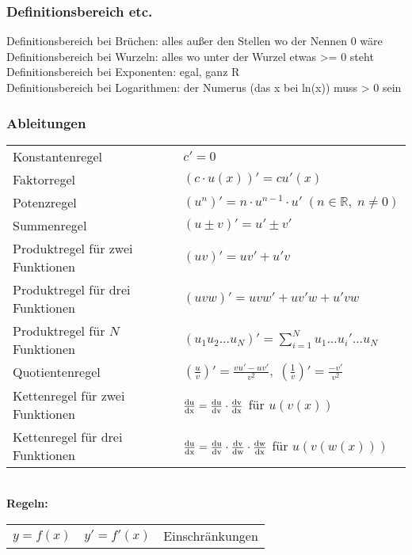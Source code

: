 \documentclass[6pt,a4paper]{scrartcl}
\begin{document}
\begin{multicols*}{2}
\subsubsection{Definitionsbereich etc.}
Definitionsbereich bei Brüchen: alles außer den Stellen wo der Nennen 0 wäre \\
Definitionsbereich bei Wurzeln: alles wo unter der Wurzel etwas >= 0 steht \\
Definitionsbereich bei Exponenten: egal, ganz R \\
Definitionsbereich bei Logarithmen: der Numerus (das x bei ln(x)) muss > 0 sein \\

\subsubsection{Ableitungen}
\begin{tabular}{ll}
Konstantenregel						& $ c'=0 $																								\\
Faktorregel							& $ (c \cdot u(x))' = c u'(x) $																			\\
Potenzregel							& $ \left(u^n\right)' = n \cdot u^{n-1} \cdot u'\; (n \in \mathbb R, \; n \neq 0) $						\\
Summenregel							& $ (u\pm v)' = u'\pm v' $																				\\
Produktregel für zwei Funktionen		& $ (uv)' = uv'+u'v $																					\\
Produktregel für drei Funktionen		& $ (uvw)' = uvw' + uv'w + u'vw $																		\\
Produktregel für $ N $ Funktionen	& $ (u_1u_2...u_N)' = \sum_{i=1}^Nu_1...u_i'...u_N $														\\
Quotientenregel						& $ \left(\frac{u}{v}\right)' = \frac{vu'-uv'}{v^2}, \; \left( \frac{1}{v}\right)' = \frac{-v'}{v^2} $		\\
Kettenregel für zwei Funktionen		& $ \frac{\rm d u}{\rm d x} = \frac{\rm d u}{\rm d v}\cdot \frac{\rm d v}{\rm d x} $ für $ u(v(x)) $		\\
Kettenregel für drei Funktionen		& $ \frac{\rm d u }{\rm d x} = \frac{\rm d u}{\rm d v}\cdot \frac{\rm d v}{\rm d w}\cdot \frac{\rm d w}{\rm d x} $ für $ u(v(w(x))) $ \\
\end{tabular}\\
\textbf{Regeln:}\\
\begin{tabular}{l|l|l}
$ y=f(x) $		& $ y'=f'(x) $ 								& Einschränkungen 									\\

\end{tabular}
\end{multicols*}
\end{document}
